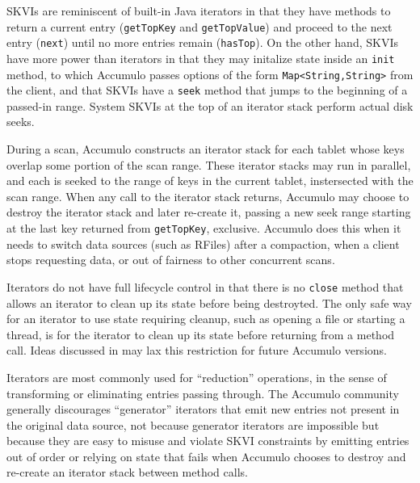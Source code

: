 SKVIs are reminiscent of built-in Java iterators %
in that they have methods to return a current entry (\texttt{getTopKey} and \texttt{getTopValue})
and proceed to the next entry (\texttt{next}) until no more entries remain (\texttt{hasTop}).
On the other hand, SKVIs have more power than iterators in that they may initalize state
inside an \texttt{init} method, to which Accumulo passes
options of the form \texttt{Map<String,String>} from the client,
and that SKVIs have a \texttt{seek} method that jumps to the beginning of a passed-in range. 
System SKVIs at the top of an iterator stack perform actual disk seeks.%

During a scan, Accumulo constructs an iterator stack for each tablet whose keys overlap some portion 
of the scan range. These iterator stacks may run in parallel, and each is seeked to the range of 
keys in the current tablet, instersected with the scan range. When any call to the iterator stack 
returns, Accumulo may choose to destroy the iterator stack and later re-create it,
passing a new seek range starting at the last key returned from \texttt{getTopKey}, exclusive.
Accumulo does this when it needs to switch data sources (such as RFiles) after a compaction, 
when a client stops requesting data, or out of fairness to other concurrent scans.

Iterators do not have full lifecycle control in that there is no \texttt{close} method 
that allows an iterator to clean up its state before being destroyted. The only safe way for an 
iterator to use state requiring cleanup, such as opening a file or starting a thread,
is for the iterator to clean up its state before returning from a method call.
Ideas discussed in \cite{ACCUMULO-3751} may lax this restriction for future Accumulo versions.


Iterators are most commonly used for ``reduction'' operations, in the sense of transforming
or eliminating entries passing through.  The Accumulo community generally discourages ``generator'' iterators 
that emit new entries not present in the original data source, not because generator iterators are impossible 
but because they are easy to misuse and violate SKVI constraints by emitting entries out of order or 
relying on state that fails when Accumulo chooses to destroy and re-create an iterator stack between method calls.

